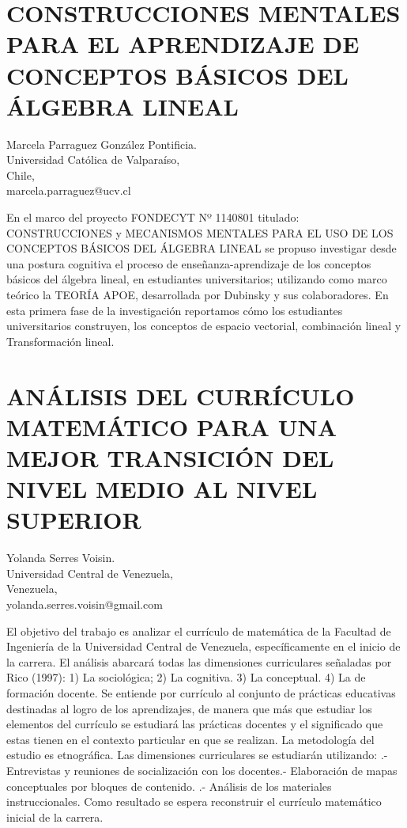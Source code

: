 

\section{CONSTRUCCIONES MENTALES PARA EL APRENDIZAJE DE CONCEPTOS BÁSICOS
DEL ÁLGEBRA LINEAL}

\begin{datos}
Marcela Parraguez González Pontificia.\\
Universidad Católica de Valparaíso,\\
\hfill  Chile, \\
\hfill marcela.parraguez@ucv.cl
\end{datos}

En el marco del proyecto FONDECYT Nº 1140801 titulado: CONSTRUCCIONES
y MECANISMOS MENTALES PARA EL USO DE LOS CONCEPTOS BÁSICOS DEL ÁLGEBRA
LINEAL se propuso investigar desde una postura cognitiva el proceso
de enseñanza-aprendizaje de los conceptos básicos del álgebra lineal,
en estudiantes universitarios; utilizando como marco teórico la TEORÍA
APOE, desarrollada por Dubinsky y sus colaboradores. En esta primera
fase de la investigación reportamos cómo los estudiantes universitarios
construyen, los conceptos de espacio vectorial, combinación lineal
y Transformación lineal. 


\section{\uppercase{ ANÁLISIS DEL Currículo MATEMÁTICO PARA UNA MEJOR TRANSICIÓN
DEL NIVEL MEDIO AL NIVEL SUPERIOR} }

\begin{datos}
Yolanda Serres Voisin.\\
Universidad Central de Venezuela,\\
\hfill  Venezuela, \\
\hfill yolanda.serres.voisin@gmail.com
\end{datos}

El objetivo del trabajo es analizar el currículo de matemática de
la Facultad de Ingeniería de la Universidad Central de Venezuela,
específicamente en el inicio de la carrera. El análisis abarcará todas
las dimensiones curriculares señaladas por Rico (1997): 1) La sociológica;
2) La cognitiva. 3) La conceptual. 4) La de formación docente. Se
entiende por currículo al conjunto de prácticas educativas destinadas
al logro de los aprendizajes, de manera que más que estudiar los elementos
del currículo se estudiará las prácticas docentes y el significado
que estas tienen en el contexto particular en que se realizan. La
metodología del estudio es etnográfica. Las dimensiones curriculares
se estudiarán utilizando: .- Entrevistas y reuniones de socialización
con los docentes.- Elaboración de mapas conceptuales por bloques de
contenido. .- Análisis de los materiales instruccionales. Como resultado
se espera reconstruir el currículo matemático inicial de la carrera.


